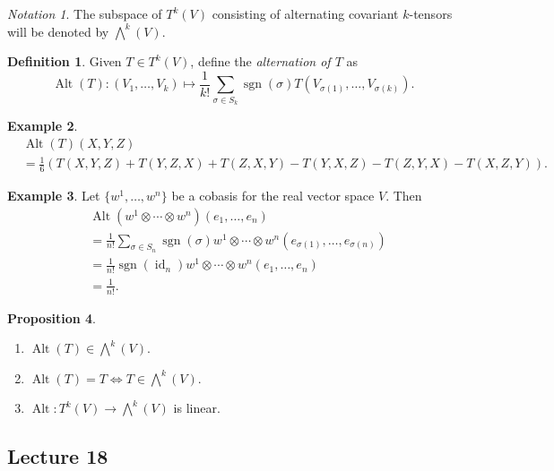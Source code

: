 \documentclass[10pt,letterpaper,cm]{nupset}
\theoremstyle{definition}
\newtheorem{definition}{Definition}[subsection]
\newtheorem{exmp}[definition]{Example}
\theoremstyle{theorem}
\newtheorem{prop}[definition]{Proposition}
\theoremstyle{remark}
\newtheorem*{notation}{Notation}
\newcommand{\1}{\mathbf{1}}
\newcommand{\0}{\vec 0}
\DeclareMathOperator{\id}{id}
\DeclareMathOperator{\Alt}{Alt}
\DeclareMathOperator{\sgn}{sgn}
\begin{document}
\begin{notation}
The  subspace of $T^k(V)$ consisting of alternating covariant $k$-tensors will be denoted by $\bigwedge^k(V)$. 
\end{notation}

\begin{definition}
Given $T\in T^k(V)$, define the \textit{alternation of $T$} as $$\Alt(T) : (V_1, \ldots, V_k) \mapsto \frac{1}{k!} \sum_{\sigma \in S_k} \sgn(\sigma) T\left(V_{\sigma(1)}, \ldots, V_{\sigma(k)}\right).$$
\end{definition}

\begin{exmp}
\begin{align*}
& \Alt(T)(X, Y, Z) 
\\ & = \frac{1}{6}\left(T(X, Y, Z) + T(Y, Z, X) + T(Z, X, Y)  -T(Y, X, Z)- T(Z, Y, X) -T(X, Z, Y)\right).
\end{align*}
\end{exmp}

\begin{exmp}
Let $\{w^1, \ldots, w^n\}$ be a cobasis for the real vector space $V$. Then
\begin{align*}
& \Alt(w^1 \otimes \cdots \otimes w^n)(e_1, \ldots, e_n)\\ & = \frac{1}{n!} \sum_{\sigma \in S_n} \sgn(\sigma)w^1 \otimes \cdots \otimes w^n\left(e_{\sigma(1)}, \ldots, e_{\sigma(n)}\right) \\ & =  \frac{1}{n!} \sgn\left(\id_n\right) w^1 \otimes \cdots \otimes w^n\left(e_{1}, \ldots, e_{n}\right) 
\\ & = \frac{1}{n!}.
\end{align*}
\end{exmp}

\begin{prop}\label{alt} $ $
\begin{enumerate}
\item $\Alt(T) \in \bigwedge^k(V)$.
\item $\Alt(T) = T \iff T \in \bigwedge^k(V)$.
\item $\Alt : T^k(V) \to \bigwedge^k(V)$ is linear. 
\end{enumerate}
\end{prop}

\subsection{Lecture 18}
\end{document}
